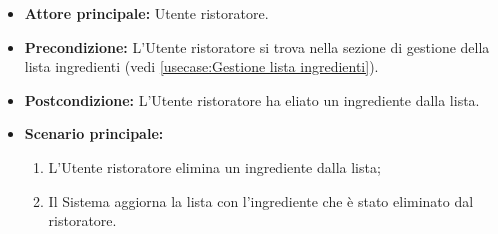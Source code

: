 \label{usecase:Eliminazione ingrediente}
\begin{itemize}

	\item \textbf{Attore principale:} Utente ristoratore.

	\item \textbf{Precondizione:} L'Utente ristoratore si trova nella sezione di gestione della lista ingredienti (vedi \autoref{usecase:Gestione lista ingredienti}).

	\item \textbf{Postcondizione:} L'Utente ristoratore ha eliato un ingrediente dalla lista.

	\item \textbf{Scenario principale:}
	\begin{enumerate}
		\item L'Utente ristoratore elimina un ingrediente dalla lista;
		\item Il Sistema aggiorna la lista con l'ingrediente che è stato eliminato dal ristoratore.
	\end{enumerate}

\end{itemize}
